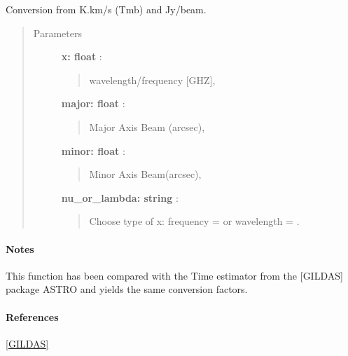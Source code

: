 \documentclass[a4paper,10pt,english]{sphinxmanual}
\begin{document}
\begin{fulllineitems}
\label{functions:astrolyze.functions.units.kelvin_to_jansky}
Conversion from K.km/s (Tmb) and Jy/beam.
\begin{quote}\begin{description}
\item[{Parameters }] \leavevmode
\textbf{x: float} :
\begin{quote}

wavelength/frequency {[}GHZ{]},
\end{quote}

\textbf{major: float} :
\begin{quote}

Major Axis Beam (arcsec),
\end{quote}

\textbf{minor: float} :
\begin{quote}

Minor Axis Beam(arcsec),
\end{quote}

\textbf{nu\_or\_lambda: string} :
\begin{quote}

Choose type of x: frequency =  or wavelength = .
\end{quote}

\end{description}\end{quote}
\paragraph{Notes}

This function has been compared with the Time estimator from the
{[}GILDAS{]} package ASTRO and yields the same conversion factors.
\paragraph{References}

{\hyperref[manual:gildas]{{[}GILDAS{]}}}

\end{fulllineitems}

\end{document}
